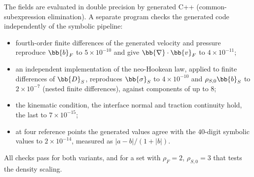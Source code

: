 The fields are evaluated in double precision by generated C++ (common-subexpression elimination).
A separate program checks the generated code independently of the symbolic pipeline:
\begin{itemize}
  \item fourth-order finite differences of the generated velocity and pressure reproduce $\bb{b}_F$ to $5\times10^{-10}$ and give $\bb{\nabla}\cdot\bb{v}_F$ to $4\times10^{-11}$;
  \item an independent implementation of the neo-Hookean law, applied to finite differences of $\bb{D}_S$, reproduces $\bb{\sigma}_S$ to $4\times10^{-10}$ and $\rho_{S,0}\bb{b}_S$ to $2\times10^{-7}$ (nested finite differences), against components of up to $8$;
  \item the kinematic condition, the interface normal and traction continuity hold, the last to $7\times10^{-15}$;
  \item at four reference points the generated values agree with the $40$-digit symbolic values to $2\times10^{-14}$, measured as $|a - b|/(1 + |b|)$.
\end{itemize}
All checks pass for both variants, and for a set with $\rho_F = 2$, $\rho_{S,0} = 3$ that tests the density scaling.
